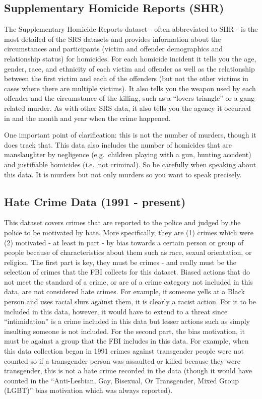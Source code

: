 \documentclass[
]{krantz}
\begin{document}
\subsection{Supplementary Homicide Reports
(SHR)}\label{supplementary-homicide-reports-shr}

The Supplementary Homicide Reports dataset - often
abbreviated to SHR - is the most detailed of the SRS
datasets and provides information about the circumstances
and participants (victim and offender demographics and
relationship status) for homicides. For each homicide
incident it tells you the age, gender, race, and ethnicity
of each victim and offender as well as the relationship
between the first victim and each of the offenders (but not
the other victims in cases where there are multiple
victims). It also tells you the weapon used by each offender
and the circumstance of the killing, such as a ``lovers
triangle'' or a gang-related murder. As with other SRS data,
it also tells you the agency it occurred in and the month
and year when the crime happened.

One important point of clarification: this is not the number
of murders, though it does track that. This data also
includes the number of homicides that are manslaughter by
negligence (e.g.~children playing with a gun, hunting
accident) and justifiable homicides (i.e.~not criminal). So
be carefully when speaking about this data. It is murders
but not only murders so you want to speak precisely.

\subsection{Hate Crime Data (1991 -
present)}\label{hate-crime-data-1991---present}

This dataset covers crimes that are reported to the police
and judged by the police to be motivated by hate. More
specifically, they are (1) crimes which were (2) motivated -
at least in part - by bias towards a certain person or group
of people because of characteristics about them such as
race, sexual orientation, or religion. The first part is
key, they must be crimes - and really must be the selection
of crimes that the FBI collects for this dataset. Biased
actions that do not meet the standard of a crime, or are of
a crime category not included in this data, are not
considered hate crimes. For example, if someone yells at a
Black person and uses racial slurs against them, it is
clearly a racist action. For it to be included in this data,
however, it would have to extend to a threat since
``intimidation'' is a crime included in this data but lesser
actions such as simply insulting someone is not included.
For the second part, the bias motivation, it must be against
a group that the FBI includes in this data. For example,
when this data collection began in 1991 crimes against
transgender people were not counted so if a transgender
person was assaulted or killed because they were
transgender, this is not a hate crime recorded in the data
(though it would have counted in the ``Anti-Lesbian, Gay,
Bisexual, Or Transgender, Mixed Group (LGBT)'' bias
motivation which was always reported).
\end{document}
